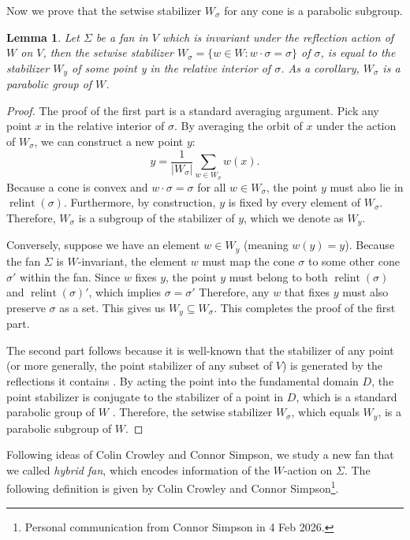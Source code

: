 \documentclass{amsart}
\newtheorem{lemma}[theorem]{Lemma}
\theoremstyle{definition}
\theoremstyle{remark}
\numberwithin{equation}{section}
\begin{document}
Now we prove that the setwise stabilizer $W_\sigma$ for any cone is a parabolic subgroup.
\begin{lemma} \label{lem-parabolic}
    Let $\Sigma$ be a fan in $V$ which is invariant under the reflection action of $W$ on $V$, then the setwise stabilizer $W_\sigma=\{w \in W: w \cdot \sigma=\sigma\}$  of $\sigma$, is equal to the stabilizer $W_y$ of some point y in the relative interior of $\sigma$. As a corollary, $W_\sigma$ is a parabolic group of $W$.
\end{lemma}
\begin{proof}
    The proof of the first part is a standard averaging argument. Pick any point $x$ in the relative interior of $\sigma$. By averaging the orbit of $x$ under the action of $W_\sigma$, we can construct a new point $y$: 
    \begin{equation} \label{eq-averaging}
    y = \frac{1}{|W_\sigma|} \sum_{w \in W_\sigma} w(x).
    \end{equation}
    Because a cone is convex and $w\cdot\sigma= \sigma$ for all $w \in W_\sigma$, the point $y$ must also lie in $\operatorname{relint}(\sigma)$. Furthermore, by construction, $y$ is fixed by every element of $W_\sigma$. Therefore, $W_\sigma$ is a subgroup of the stabilizer of $y$, which we denote as $W_y$.
    
Conversely, suppose we have an element $w \in W_y$ (meaning $w(y) = y$). Because the fan $\Sigma$ is $W$-invariant, the element $w$ must map the cone $\sigma$ to some other cone $\sigma'$ within the fan. Since $w$ fixes $y$, the point $y$ must belong to both $\operatorname{relint}(\sigma)$ and $\operatorname{relint}(\sigma)'$, which implies $\sigma=\sigma'$
Therefore, any $w$ that fixes $y$ must also preserve $\sigma$ as a set. This gives us $W_y \subseteq W_\sigma$. This completes the proof of the first part. 

The second part follows because it is well-known that the stabilizer of any point (or more generally, the point stabilizer of any subset of $V$) is generated by the reflections it contains \cite[Theorem 1.12]{Humphreys90}. By acting the point into the fundamental domain $D$, the point stabilizer is conjugate to the stabilizer of a point in $D$, which is a standard parabolic group of $W$ \cite[Exercise 2 of Section 1.12]{Humphreys90}.
Therefore, the setwise stabilizer $W_\sigma$, which equals $W_y$, is a parabolic subgroup of $W$.
\end{proof}

Following ideas of Colin Crowley and Connor Simpson, we study a new fan that we called \emph{hybrid fan}, which encodes information of the $W$-action on $\Sigma$. The following definition is given by Colin Crowley and Connor Simpson\footnote{Personal communication from Connor Simpson in 4 Feb 2026.}.
\end{document}
